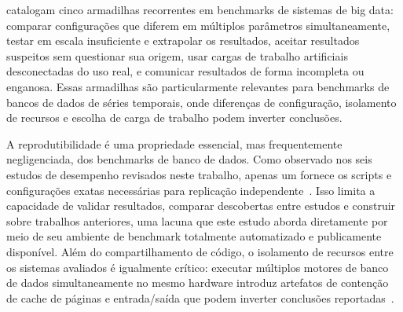 \cite{shapira2016pitfalls} catalogam cinco armadilhas recorrentes em benchmarks de sistemas de
big data: comparar configurações que diferem em múltiplos parâmetros simultaneamente, testar
em escala insuficiente e extrapolar os resultados, aceitar resultados suspeitos sem questionar
sua origem, usar cargas de trabalho artificiais desconectadas do uso real, e comunicar
resultados de forma incompleta ou enganosa. Essas armadilhas são particularmente relevantes
para benchmarks de bancos de dados de séries temporais, onde diferenças de configuração,
isolamento de recursos e escolha de carga de trabalho podem inverter conclusões.

A reprodutibilidade é uma propriedade essencial, mas frequentemente negligenciada, dos benchmarks
de banco de dados. Como observado nos seis estudos de desempenho revisados neste trabalho, apenas um
fornece os scripts e configurações exatas necessárias para replicação
independente~\citep{pereira2023mulletbench}. Isso limita a capacidade
de validar resultados, comparar descobertas entre estudos e construir sobre trabalhos anteriores,
uma lacuna que este estudo aborda diretamente por meio de seu ambiente de benchmark
totalmente automatizado e publicamente disponível.
Além do compartilhamento de código, o isolamento de recursos entre os sistemas avaliados é
igualmente crítico: executar múltiplos motores de banco de dados simultaneamente no mesmo
hardware introduz artefatos de contenção de cache de páginas e entrada/saída que podem inverter
conclusões reportadas~\citep{shapira2016pitfalls}.
